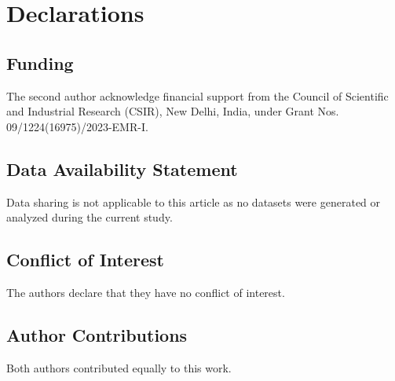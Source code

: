\documentclass[11pt, reqno]{amsart}
\numberwithin{equation}{section}
\begin{document}
\section*{{\bf Declarations}}
\subsection*{Funding}
The second author acknowledge financial support from the Council of Scientific and Industrial Research (CSIR), New Delhi, India, under Grant Nos. 09/1224(16975)/2023-EMR-I.
\subsection*{Data Availability Statement}
Data sharing is not applicable to this article as no datasets were generated or analyzed during the current study.
\subsection*{Conflict of Interest}
The authors declare that they have no conflict of interest. 
\subsection*{Author Contributions}
Both authors contributed equally to this work.
\end{document}
